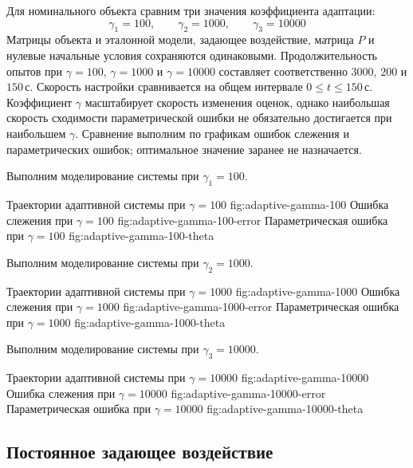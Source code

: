 Для номинального объекта сравним три значения коэффициента адаптации:
\begin{equation}
  \gamma_1=100,
  \qquad \gamma_2=1000,
  \qquad \gamma_3=10000
\end{equation}
Матрицы объекта и эталонной модели, задающее воздействие, матрица $P$
и нулевые начальные условия сохраняются одинаковыми.
Продолжительность опытов при $\gamma=100$, $\gamma=1000$
и $\gamma=10000$ составляет соответственно $3000$, $200$
и $150\,\text{с}$.
Скорость настройки сравнивается на общем интервале $0\le t\le150\,\text{с}$.
Коэффициент $\gamma$ масштабирует скорость изменения оценок,
однако наибольшая скорость сходимости параметрической ошибки
не обязательно достигается при наибольшем $\gamma$.
Сравнение выполним по графикам ошибок слежения и параметрических ошибок;
оптимальное значение заранее не назначается.

Выполним моделирование системы при $\gamma_1=100$.

  {Траектории адаптивной системы при $\gamma=100$}
  {fig:adaptive-gamma-100}
  {Ошибка слежения при $\gamma=100$}
  {fig:adaptive-gamma-100-error}
  {Параметрическая ошибка при $\gamma=100$}
  {fig:adaptive-gamma-100-theta}

Выполним моделирование системы при $\gamma_2=1000$.

  {Траектории адаптивной системы при $\gamma=1000$}
  {fig:adaptive-gamma-1000}
  {Ошибка слежения при $\gamma=1000$}
  {fig:adaptive-gamma-1000-error}
  {Параметрическая ошибка при $\gamma=1000$}
  {fig:adaptive-gamma-1000-theta}

Выполним моделирование системы при $\gamma_3=10000$.

  {Траектории адаптивной системы при $\gamma=10000$}
  {fig:adaptive-gamma-10000}
  {Ошибка слежения при $\gamma=10000$}
  {fig:adaptive-gamma-10000-error}
  {Параметрическая ошибка при $\gamma=10000$}
  {fig:adaptive-gamma-10000-theta}

\subsection{Постоянное задающее воздействие}

